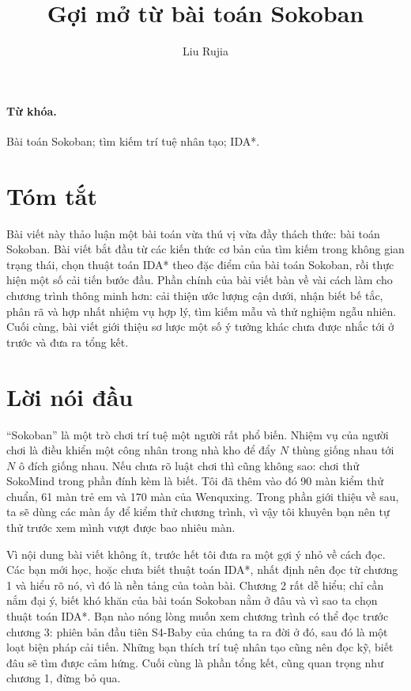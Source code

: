 \documentclass[11pt]{article}
\title{Gợi mở từ bài toán Sokoban}
\author{Liu Rujia}
\date{}
\begin{document}
\maketitle


\paragraph{Từ khóa.}
Bài toán Sokoban; tìm kiếm trí tuệ nhân tạo; IDA*.

\section*{Tóm tắt}

Bài viết này thảo luận một bài toán vừa thú vị vừa đầy thách thức: bài toán
Sokoban. Bài viết bắt đầu từ các kiến thức cơ bản của tìm kiếm trong không
gian trạng thái, chọn thuật toán IDA* theo đặc điểm của bài toán Sokoban, rồi
thực hiện một số cải tiến bước đầu. Phần chính của bài viết bàn về vài cách
làm cho chương trình thông minh hơn: cải thiện ước lượng cận dưới, nhận biết
bế tắc, phân rã và hợp nhất nhiệm vụ hợp lý, tìm kiếm mẫu và thử nghiệm ngẫu
nhiên. Cuối cùng, bài viết giới thiệu sơ lược một số ý tưởng khác chưa được
nhắc tới ở trước và đưa ra tổng kết.

\renewcommand{\contentsname}{Mục lục}
\tableofcontents

\section*{Lời nói đầu}

``Sokoban'' là một trò chơi trí tuệ một người rất phổ biến. Nhiệm vụ của
người chơi là điều khiển một công nhân trong nhà kho để đẩy \(N\) thùng giống
nhau tới \(N\) ô đích giống nhau. Nếu chưa rõ luật chơi thì cũng không sao:
chơi thử SokoMind trong phần đính kèm là biết. Tôi đã thêm vào đó 90 màn kiểm
thử chuẩn, 61 màn trẻ em và 170 màn của Wenquxing. Trong phần giới thiệu về
sau, ta sẽ dùng các màn ấy để kiểm thử chương trình, vì vậy tôi khuyên bạn
nên tự thử trước xem mình vượt được bao nhiêu màn.

Vì nội dung bài viết không ít, trước hết tôi đưa ra một gợi ý nhỏ về cách
đọc. Các bạn mới học, hoặc chưa biết thuật toán IDA*, nhất định nên đọc từ
chương 1 và hiểu rõ nó, vì đó là nền tảng của toàn bài. Chương 2 rất dễ hiểu;
chỉ cần nắm đại ý, biết khó khăn của bài toán Sokoban nằm ở đâu và vì sao ta
chọn thuật toán IDA*. Bạn nào nóng lòng muốn xem chương trình có thể đọc
trước chương 3: phiên bản đầu tiên S4-Baby của chúng ta ra đời ở đó, sau đó
là một loạt biện pháp cải tiến. Những bạn thích trí tuệ nhân tạo cũng nên đọc
kỹ, biết đâu sẽ tìm được cảm hứng. Cuối cùng là phần tổng kết, cũng quan
trọng như chương 1, đừng bỏ qua.
\end{document}
